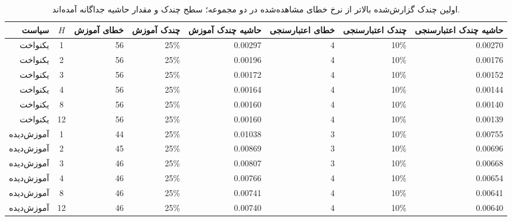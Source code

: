 \begin{table}[htbp]
\centering\scriptsize
\caption{اولین چندک گزارش‌شده بالاتر از نرخ خطای مشاهده‌شده در دو مجموعه؛ سطح چندک و مقدار حاشیه جداگانه آمده‌اند.}
\label{tab:ch4-e09-first-quantile-after-error}
\begin{tabular}{rcrrrrrr}\hline
سیاست & $H$ & خطای آموزش & چندک آموزش & حاشیه چندک آموزش & خطای اعتبارسنجی & چندک اعتبارسنجی & حاشیه چندک اعتبارسنجی\\\hline
یکنواخت & 1 & 56 & 25\% & 0.00297 & 4 & 10\% & 0.00270\\
یکنواخت & 2 & 56 & 25\% & 0.00196 & 4 & 10\% & 0.00176\\
یکنواخت & 3 & 56 & 25\% & 0.00172 & 4 & 10\% & 0.00152\\
یکنواخت & 4 & 56 & 25\% & 0.00164 & 4 & 10\% & 0.00144\\
یکنواخت & 8 & 56 & 25\% & 0.00160 & 4 & 10\% & 0.00140\\
یکنواخت & 12 & 56 & 25\% & 0.00160 & 4 & 10\% & 0.00139\\
\hline
آموزش‌دیده & 1 & 44 & 25\% & 0.01038 & 3 & 10\% & 0.00755\\
آموزش‌دیده & 2 & 45 & 25\% & 0.00869 & 3 & 10\% & 0.00696\\
آموزش‌دیده & 3 & 46 & 25\% & 0.00807 & 3 & 10\% & 0.00668\\
آموزش‌دیده & 4 & 46 & 25\% & 0.00766 & 4 & 10\% & 0.00654\\
آموزش‌دیده & 8 & 46 & 25\% & 0.00741 & 4 & 10\% & 0.00641\\
آموزش‌دیده & 12 & 46 & 25\% & 0.00740 & 4 & 10\% & 0.00640\\
\hline
\end{tabular}
\end{table}
